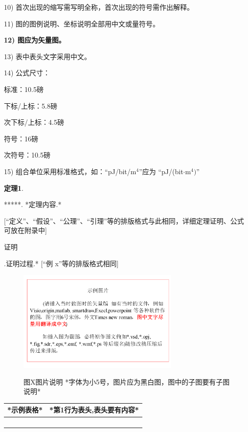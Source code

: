\documentclass[10.5pt,compsoc]{CjC}
\theoremstyle{mystyle}
\begin{document}
\begin{CJK*}{GBK}{song}
10) 首次出现的缩写需写明全称，首次出现的符号需作出解释。

11) 图的图例说明、坐标说明全部用中文或量符号。

\textbf{12) 图应为矢量图。}

13) 表中表头文字采用中文。

14) 公式尺寸：

标准：10.5磅

下标/上标：5.8磅

次下标/上标：4.5磅

符号：16磅

次符号：10.5磅

15) 组合单位采用标准格式，如：``pJ/bit/m$^{4}$''应为 ``pJ/(bit$\cdot
$m$^{4})$''

{\begin{CJK*}{GBK}{hei}\textbf{定理1}.\end{CJK*}}\quad ******. *定理内容.*

[``定义''、``假设''、``公理''、``引理''等的排版格式与此相同，详细定理证明、公式可放在附录中]

{\begin{CJK*}{GBK}{fs}证明\end{CJK*}}.\quad  *证明过程.* [``例 x''等的排版格式相同]


\begin{figure}[htbp]
\centerline{\includegraphics[width=3.15in,height=1.98in]{CJC1.pdf}}
图X\quad  图片说明 *字体为小5号，图片应为黑白图，图中的子图要有子图说明*
\label{fig1}
\end{figure}

\begin{table}[htbp]
\vspace {-2.5mm}
\begin{center}
\begin{tabular}{ll}
\toprule
*示例表格*&*第1行为表头,表头要有内容* \\
\hline
&
 \\
&
 \\
&
 \\
&
 \\
\bottomrule
\end{tabular}
\label{tab1}
\end{center}
\end{table}


\end{CJK*}
\end{document}
